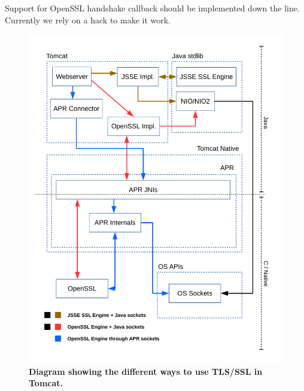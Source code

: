 \documentclass[11pt,a4paper,bibliography=totocnumbered]{scrartcl}
\begin{document}
Support for OpenSSL handshake callback should be implemented down the line. Currently we rely on a hack to make it work.
\newpage
\printbibliography

\begin{figure}[!h]
	\begin{center}
		\includegraphics[scale=0.7]{diagram_current_way.pdf}
	\end{center}
	\caption{\textbf{Diagram showing the different ways to use TLS/SSL in Tomcat.}}
	\label{fig:current}
\end{figure}
\end{document}
